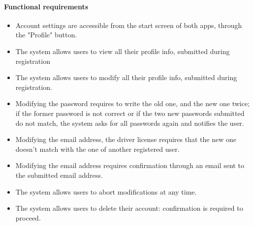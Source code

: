 \paragraph{Functional requirements }
\begin{itemize}
	\item Account settings are accessible from the start screen of both apps, through the "Profile" button.
	\item The system allows users to view all their profile info, submitted during registration
	\item The system allows users to modify all their profile info, submitted during registration.
	\item Modifying the password requires to write the old one, and the new one twice; if the former password is not correct or if the two new passwords submitted do not match, the system asks for all passwords again and notifies the user.
	\item Modifying the email address, the driver license requires that the new one doesn't match with the one of another registered user.
	\item Modifying the email address requires confirmation through an email sent to the submitted email address.
	\item The system allows users to abort modifications at any time.
	\item The system allows users to delete their account: confirmation is required to proceed.
\end{itemize}

